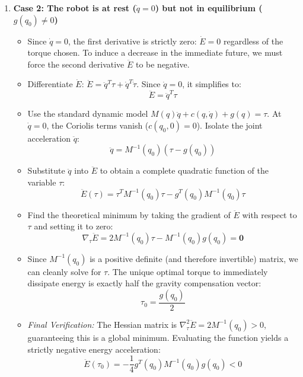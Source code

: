 \documentclass[11pt,a4paper]{article}
\begin{document}
\begin{enumerate}
    \item \textbf{Case 2: The robot is at rest ($\dot{q} = 0$) but not in equilibrium ($g(q_0) \neq 0$)}
    \begin{itemize}
        \item Since $\dot{q} = 0$, the first derivative is strictly zero: $\dot{E} = 0$ regardless of the torque chosen. To induce a decrease in the immediate future, we must force the second derivative $\ddot{E}$ to be negative.
        \item Differentiate $\dot{E}$: $\ddot{E} = \ddot{q}^T \tau + \dot{q}^T \dot{\tau}$. Since $\dot{q} = 0$, it simplifies to:
        \begin{equation}
            \ddot{E} = \ddot{q}^T \tau
        \end{equation}
        \item Use the standard dynamic model $M(q)\ddot{q} + c(q,\dot{q}) + g(q) = \tau$. At $\dot{q}=0$, the Coriolis terms vanish ($c(q_0,0)=0$). Isolate the joint acceleration $\ddot{q}$:
        \begin{equation}
            \ddot{q} = M^{-1}(q_0)(\tau - g(q_0))
        \end{equation}
        \item Substitute $\ddot{q}$ into $\ddot{E}$ to obtain a complete quadratic function of the variable $\tau$:
        \begin{equation}
            \ddot{E}(\tau) = \tau^T M^{-1}(q_0) \tau - g^T(q_0) M^{-1}(q_0) \tau
        \end{equation}
        \item Find the theoretical minimum by taking the gradient of $\ddot{E}$ with respect to $\tau$ and setting it to zero:
        \begin{equation}
            \nabla_{\tau}\ddot{E} = 2 M^{-1}(q_0) \tau - M^{-1}(q_0) g(q_0) = \mathbf{0}
        \end{equation}
        \item Since $M^{-1}(q_0)$ is a positive definite (and therefore invertible) matrix, we can cleanly solve for $\tau$. The unique optimal torque to immediately dissipate energy is exactly half the gravity compensation vector:
        \begin{equation}
            \tau_{0} = \frac{g(q_0)}{2}
        \end{equation}
        \item \emph{Final Verification:} The Hessian matrix is $\nabla^2_{\tau}\ddot{E} = 2M^{-1}(q_0) > 0$, guaranteeing this is a global minimum. Evaluating the function yields a strictly negative energy acceleration:
        \begin{equation}
            \ddot{E}(\tau_0) = -\frac{1}{4} g^T(q_0) M^{-1}(q_0) g(q_0) < 0
        \end{equation}
    \end{itemize}
\end{enumerate}
\end{document}
